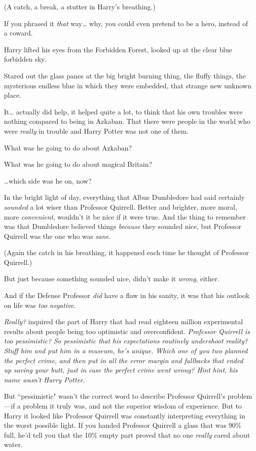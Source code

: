 (A catch, a break, a stutter in Harry's breathing.)

If you phrased it \emph{that} way{\ldots} why, you could even pretend to be a hero, instead of a coward.

Harry lifted his eyes from the Forbidden Forest, looked up at the clear blue forbidden sky.

Stared out the glass panes at the big bright burning thing, the fluffy things, the mysterious endless blue in which they were embedded, that strange new unknown place.

It{\ldots} actually did help, it helped quite a lot, to think that his own troubles were nothing compared to being in Azkaban. That there were people in the world who were \emph{really} in trouble and Harry Potter was not one of them.

What was he going to do about Azkaban?

What was he going to do about magical Britain?

{\ldots}which side was he on, now?

In the bright light of day, everything that Albus Dumbledore had said certainly \emph{sounded} a lot wiser than Professor Quirrell. Better and brighter, more moral, more \emph{convenient}, wouldn't it be nice if it were true. And the thing to remember was that Dumbledore believed things \emph{because} they sounded nice, but Professor Quirrell was the one who was \emph{sane}.

(Again the catch in his breathing, it happened each time he thought of Professor Quirrell.)

But just because something sounded nice, didn't make it \emph{wrong}, either.

And if the Defense Professor \emph{did} have a flaw in his sanity, it was that his outlook on life was \emph{too negative}.

\emph{Really?} inquired the part of Harry that had read eighteen million experimental results about people being too optimistic and overconfident. \emph{Professor Quirrell is too pessimistic? So pessimistic that his expectations routinely \emph{undershoot} reality? Stuff him and put him in a museum, he's unique. Which one of you two planned the perfect crime, and \emph{then} put in all the error margin and fallbacks that ended up saving your butt, \emph{just in case} the perfect crime went wrong? Hint hint, his name wasn't Harry Potter.}

But ``pessimistic" wasn't the correct word to describe Professor Quirrell's problem---if a problem it truly was, and not the superior wisdom of experience. But to Harry it looked like Professor Quirrell was constantly interpreting everything in the worst possible light. If you handed Professor Quirrell a glass that was 90\% full, he'd tell you that the 10\% empty part proved that no one \emph{really} cared about water.

